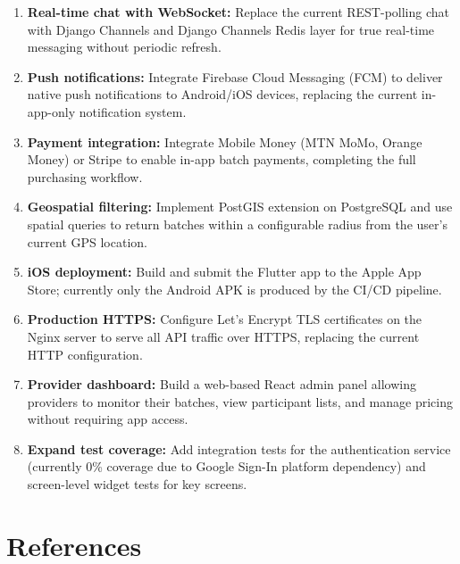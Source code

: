 \documentclass[12pt, a4paper]{report}
\begin{document}
\begin{enumerate}[leftmargin=*, label=\textcolor{batchitGreen}{\textbf{\arabic*.}}]
  \item \textbf{Real-time chat with WebSocket:} Replace the current REST-polling chat with Django Channels and Django Channels Redis layer for true real-time messaging without periodic refresh.
  \item \textbf{Push notifications:} Integrate Firebase Cloud Messaging (FCM) to deliver native push notifications to Android/iOS devices, replacing the current in-app-only notification system.
  \item \textbf{Payment integration:} Integrate Mobile Money (MTN MoMo, Orange Money) or Stripe to enable in-app batch payments, completing the full purchasing workflow.
  \item \textbf{Geospatial filtering:} Implement PostGIS extension on PostgreSQL and use spatial queries to return batches within a configurable radius from the user's current GPS location.
  \item \textbf{iOS deployment:} Build and submit the Flutter app to the Apple App Store; currently only the Android APK is produced by the CI/CD pipeline.
  \item \textbf{Production HTTPS:} Configure Let's Encrypt TLS certificates on the Nginx server to serve all API traffic over HTTPS, replacing the current HTTP configuration.
  \item \textbf{Provider dashboard:} Build a web-based React admin panel allowing providers to monitor their batches, view participant lists, and manage pricing without requiring app access.
  \item \textbf{Expand test coverage:} Add integration tests for the authentication service (currently 0\% coverage due to Google Sign-In platform dependency) and screen-level widget tests for key screens.
\end{enumerate}

\chapter*{References}
\end{document}
